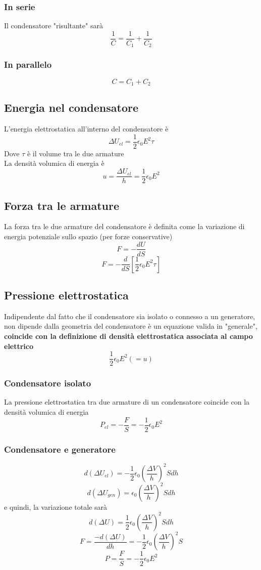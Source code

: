 \documentclass[a4paper]{report}
\begin{document}
  \subsubsection{In serie}
  Il condensatore "risultante" sarà
  $$ \frac{1}{C} = \frac{1}{C_1} + \frac{1}{C_2} $$

  \subsubsection{In parallelo}
  $$ C = C_1 + C_2 $$

  \subsection{Energia nel condensatore}
  L'energia elettrostatica all'interno del condensatore è
  $$ \Delta U_{el} = \frac{1}{2} \epsilon_0 E^2 \tau $$
  Dove $\tau$ è il volume tra le due armature\\
  La densità volumica di energia è
  $$ u = \frac{\Delta U_{el}}{h} = \frac{1}{2} \epsilon_0 E^2 $$

  \subsection{Forza tra le armature}
  La forza tra le due armature del condensatore è definita come la variazione di energia potenziale sullo spazio (per forze conservative)
  $$ F = -\frac{dU}{dS} $$
  $$ F = -\frac{d}{dS}[\frac{1}{2} \epsilon_0 E^2 \tau] $$

  \subsection{Pressione elettrostatica}
  Indipendente dal fatto che il condensatore sia isolato o connesso a un generatore, non dipende dalla geometria del condensatore è un equazione valida in "generale", \textbf{coincide con la definizione di densità elettrostatica associata al campo elettrico}
  $$ \frac{1}{2} \epsilon_0 E^2 (=u) $$

  \subsubsection{Condensatore isolato}
  La pressione elettrostatica tra due armature di un condensatore coincide con la densità volumica di energia
  $$ P_{el} = - \frac{F}{S} = -\frac{1}{2} \epsilon_0 E^2 $$

  \subsubsection{Condensatore e generatore}
  $$ d(\Delta U_{el}) = -\frac{1}{2} \epsilon_0 (\frac{\Delta V}{h})^2 S dh $$
  $$ d(\Delta U_{gen}) = \epsilon_0 (\frac{\Delta V}{h})^2 S dh $$
  e quindi, la variazione totale sarà
  $$ d(\Delta U) =\frac{1}{2} \epsilon_0 (\frac{\Delta V}{h})^2 S dh $$
  $$ F = \frac{-d(\Delta U)}{dh} = -\frac{1}{2} \epsilon_0 (\frac{\Delta V}{h})^2 S $$
  $$ P = \frac{F}{S} = -\frac{1}{2} \epsilon_0 E^2 $$
\end{document}
